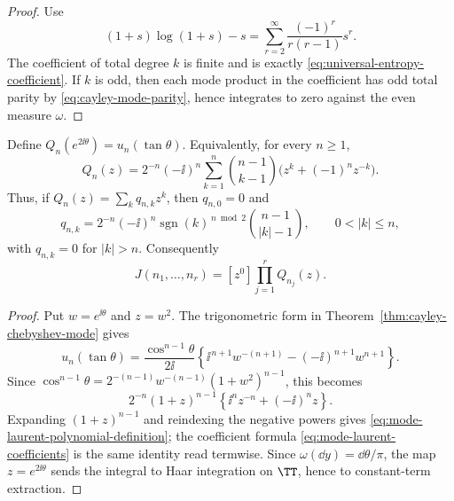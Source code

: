 \begin{proof}
Use
\[
(1+s)\log(1+s)-s=\sum_{r=2}^{\infty}\frac{(-1)^r}{r(r-1)}s^r.
\]
The coefficient of total degree \(k\) is finite and is exactly
\eqref{eq:universal-entropy-coefficient}.  If \(k\) is odd, then each mode
product in the coefficient has odd total parity by
\eqref{eq:cayley-mode-parity}, hence integrates to zero against the even
measure \(\omega\).
\end{proof}

\begin{theorem}%
\label{thm:finite-fourier-mode-integral-algorithm}
Define \(Q_n(e^{2\ii\theta})=u_n(\tan\theta)\).  Equivalently, for every
\(n\ge1\),
\begin{equation}\label{eq:mode-laurent-polynomial-definition}
Q_n(z)=2^{-n}(-\ii)^n
\sum_{k=1}^{n}\binom{n-1}{k-1}
\bigl(z^k+(-1)^nz^{-k}\bigr).
\end{equation}
Thus, if \(Q_n(z)=\sum_kq_{n,k}z^k\), then \(q_{n,0}=0\) and
\begin{equation}\label{eq:mode-laurent-coefficients}
q_{n,k}=
2^{-n}(-\ii)^n\operatorname{sgn}(k)^{\,n\bmod2}
\binom{n-1}{|k|-1},
\qquad 0<|k|\le n,
\end{equation}
with \(q_{n,k}=0\) for \(|k|>n\).
Consequently
\begin{equation}\label{eq:mode-integral-constant-term}
J(n_1,\ldots,n_r)=[z^0]\prod_{j=1}^r Q_{n_j}(z).
\end{equation}
\end{theorem}

\ifdefined\JFAArticleMain
{}
\else
\begin{proof}
Put \(w=e^{\ii\theta}\) and \(z=w^2\).  The trigonometric form in
Theorem~\ref{thm:cayley-chebyshev-mode} gives
\[
u_n(\tan\theta)
=\frac{\cos^{n-1}\theta}{2\ii}
\left\{\ii^{\,n+1}w^{-(n+1)}
-(-\ii)^{n+1}w^{n+1}\right\}.
\]
Since
\(\cos^{n-1}\theta=2^{-(n-1)}w^{-(n-1)}(1+w^2)^{n-1}\), this becomes
\[
2^{-n}(1+z)^{n-1}
\left\{\ii^nz^{-n}+(-\ii)^nz\right\}.
\]
Expanding \((1+z)^{n-1}\) and reindexing the negative powers gives
\eqref{eq:mode-laurent-polynomial-definition}; the coefficient formula
\eqref{eq:mode-laurent-coefficients} is the same identity read termwise.
Since \(\omega(\dd y)=\dd\theta/\pi\), the map \(z=e^{2\ii\theta}\) sends
the integral to Haar integration on \(\TT\), hence to constant-term
extraction.
\end{proof}
\fi

